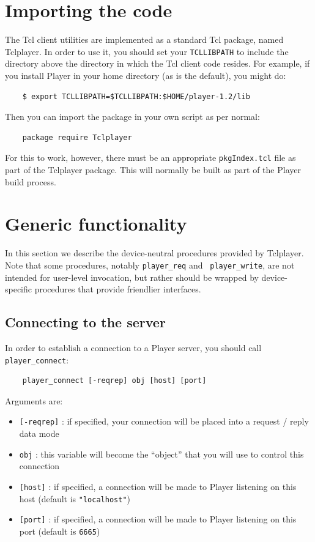 \documentclass[11pt]{article}
\def\DEFAULTPORT {6665}
\begin{document}
\section{Importing the code}
The Tcl client utilities are implemented as a standard Tcl package, named
Tclplayer.  In order to use it, you should set your {\tt TCLLIBPATH}
to include the directory above the directory in which the Tcl client code
resides.  For example, if you install Player in your home directory (as is
the default), you might do:
\begin{verbatim}
    $ export TCLLIBPATH=$TCLLIBPATH:$HOME/player-1.2/lib
\end{verbatim}
Then you can import the package in your own script as per normal:
\begin{verbatim}
    package require Tclplayer
\end{verbatim}
For this to work, however, there must be an appropriate {\tt pkgIndex.tcl} 
file as part of the Tclplayer package.  This will normally be built as part of
the Player build process.

\section{Generic functionality}
In this section we describe the device-neutral procedures provided by
Tclplayer.  Note that some procedures, notably {\tt player\_req} and {\tt
player\_write}, are not intended for user-level invocation, but rather should
be wrapped by device-specific procedures that provide friendlier interfaces.

\subsection{Connecting to the server}
\label{sect:player-connect}
In order to establish a connection to a Player server, you should call {\tt
player\_connect}:
\begin{verbatim}
    player_connect [-reqrep] obj [host] [port]
\end{verbatim}
Arguments are:
\begin{itemize}
\item {\tt [-reqrep]} : if specified, your connection will be placed into a
request / reply data mode
\item {\tt obj} : this variable will become the ``object'' that you will use
to control this connection
\item {\tt [host]} : if specified, a connection will be made to Player
listening on this host (default is {\tt "localhost"})
\item {\tt [port]} : if specified, a connection will be made to Player
listening on this port (default is {\tt \DEFAULTPORT})
\end{itemize}
\end{document}
